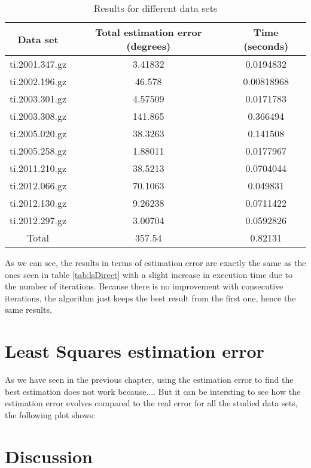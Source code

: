\begin{table}[h!]
	\centering
	\def\arraystretch{1.2}
	\begin{tabular}{|c c c|} 
		\hline
		Data set & Total estimation error (degrees) & Time (seconds) \\ [0.5ex] 
		\hline\hline
		ti.2001.347.gz & 3.41832 & 0.0194832 \\
		\hline
		ti.2002.196.gz & 46.578 & 0.00818968 \\
		\hline
		ti.2003.301.gz & 4.57509 & 0.0171783 \\
		\hline
		ti.2003.308.gz & 141.865 & 0.366494 \\
		\hline
		ti.2005.020.gz & 38.3263 & 0.141508 \\
		\hline
		ti.2005.258.gz & 1.88011 & 0.0177967 \\
		\hline
		ti.2011.210.gz & 38.5213 & 0.0704044 \\
		\hline
		ti.2012.066.gz & 70.1063 & 0.049831 \\
		\hline
		ti.2012.130.gz & 9.26238 & 0.0711422 \\
		\hline
		ti.2012.297.gz & 3.00704 & 0.0592826 \\
		\hline
		Total & 357.54 & 0.82131 \\
		\hline
	\end{tabular}
	\caption{Results for different data sets}
\end{table}

As we can see, the results in terms of estimation error are exactly the same as the ones seen in table \ref{tab:lsDirect} with a slight increase in execution time due to the number of iterations. Because there is no improvement with consecutive iterations, the algorithm just keeps the best result from the first one, hence the same results.

\section{Least Squares estimation error}

As we have seen in the previous chapter, using the estimation error to find the best estimation does not work because.... But it can be intersting to see how the estimation error evolves compared to the real error for all the studied data sets, the following plot shows:

\section{Discussion}












